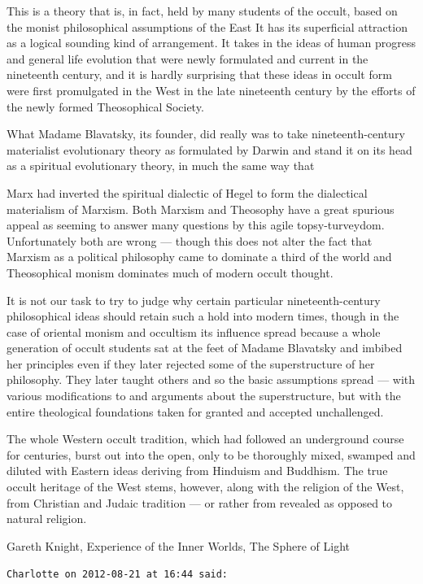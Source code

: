\begin{footnotesize}
\begin{sffamily}
This is a theory that is, in fact, held by many students of the occult, based on the monist philosophical assumptions of the East It has its superficial attraction as a logical sounding kind of arrangement. It takes in the ideas of human progress and general life evolution that were newly formulated and current in the nineteenth century, and it is hardly surprising that these ideas in occult form were first promulgated in the West in the late nineteenth century by the efforts of the newly formed Theosophical Society.

What Madame Blavatsky, its founder, did really was to take nineteenth-century materialist evolutionary theory as formulated by Darwin and stand it on its head as a spiritual evolutionary theory, in much the same way that

Marx had inverted the spiritual dialectic of Hegel to form the dialectical materialism of Marxism. Both Marxism and Theosophy have a great spurious appeal as seeming to answer many questions by this agile topsy-turveydom. Unfortunately both are wrong — though this does not alter the fact that Marxism as a political philosophy came to dominate a third of the world and Theosophical monism dominates much of modern occult thought.

It is not our task to try to judge why certain particular nineteenth-century philosophical ideas should retain such a hold into modern times, though in the case of oriental monism and occultism its influence spread because a whole generation of occult students sat at the feet of Madame Blavatsky and imbibed her principles even if they later rejected some of the superstructure of her philosophy. They later taught others and so the basic assumptions spread — with various modifications to and arguments about the superstructure, but with the entire theological foundations taken for granted and accepted unchallenged.

The whole Western occult tradition, which had followed an underground course for centuries, burst out into the open, only to be thoroughly mixed, swamped and diluted with Eastern ideas deriving from Hinduism and Buddhism. The true occult heritage of the West stems, however, along with the religion of the West, from Christian and Judaic tradition — or rather from revealed as opposed to natural religion.

Gareth Knight, Experience of the Inner Worlds, The Sphere of Light


\hfill

\texttt{Charlotte on 2012-08-21 at 16:44 said: }


\end{sffamily}
\end{footnotesize}

